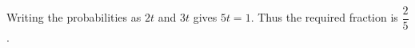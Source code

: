 Writing the probabilities as $2t$ and $3t$ gives $5t=1$. Thus the required fraction is $\boxed{\dfrac{2}{5}}$.
